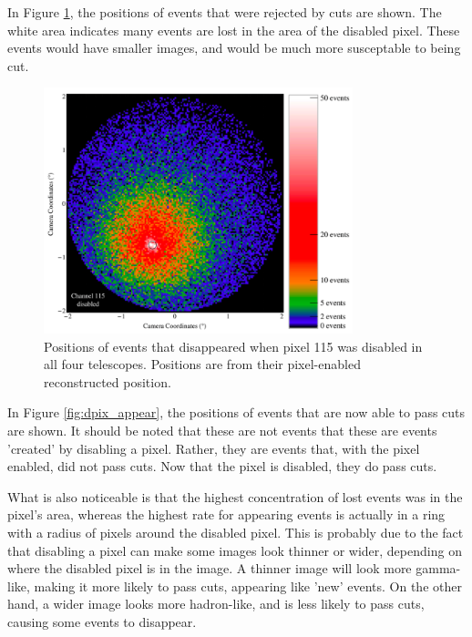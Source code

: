     In Figure \ref{fig:dpix_disappear}, the positions of events that were rejected by cuts are shown.
    The white area indicates many events are lost in the area of the disabled pixel.
    These events would have smaller images, and would be much more susceptable to being cut.

    \begin{figure}[ht]
      \centering
      \includegraphics[width=0.8\textwidth]{images/disabled_pixel/disappearing_events}
      \caption[Disappearing Events]{
        Positions of events that disappeared when pixel 115 was disabled in all four telescopes.
        Positions are from their pixel-enabled reconstructed position.
      }
      \label{fig:dpix_disappear}
    \end{figure}

    In Figure \ref{fig:dpix_appear}, the positions of events that are now able to pass cuts are shown.
    It should be noted that these are not events that these are events 'created' by disabling a pixel.
    Rather, they are events that, with the pixel enabled, did not pass cuts.
    Now that the pixel is disabled, they do pass cuts.

    What is also noticeable is that the highest concentration of lost events was in the pixel's area, whereas the highest rate for appearing events is actually in a ring with a radius of  pixels around the disabled pixel.
    This is probably due to the fact that disabling a pixel can make some images look thinner or wider, depending on where the disabled pixel is in the image.
    A thinner image will look more gamma-like, making it more likely to pass cuts, appearing like 'new' events.
    On the other hand, a wider image looks more hadron-like, and is less likely to pass cuts, causing some events to disappear.

